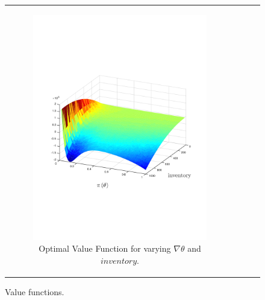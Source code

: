 {\begin{figure}[ht]
\begin{tabular}{cccc}
            \begin{subfigure}{0.24\textwidth}\centering\includegraphics[width=1.0\linewidth]{images/oe_vf_deriv_new}\caption{Optimal Value Function for varying {\footnotesize $\nabla \theta $} and {\footnotesize $ inventory $}.}\label{fig:oe_vf_deriv}\end{subfigure}\\            
        \end{tabular}
        \caption{Value functions.}
        \label{tab:vf_Results}
    \end{figure}
}


